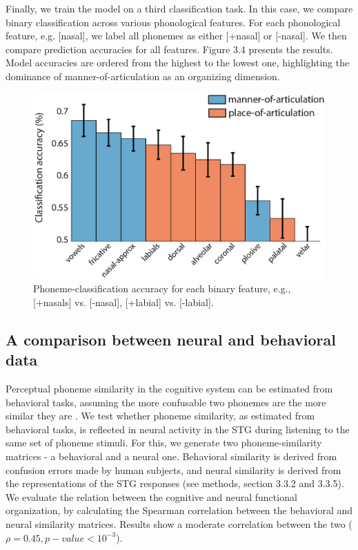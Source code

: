 Finally, we train the model on a third classification task. In this case, we compare binary classification across various phonological features. For each phonological feature, e.g. [nasal], we label all phonemes as either [+nasal] or [-nasal]. We then compare prediction accuracies for all features. Figure 3.4 presents the results. Model accuracies are ordered from the highest to the lowest one, highlighting the dominance of manner-of-articulation as an organizing dimension.

\begin{figure}[H]
\vspace{.3in}
\includegraphics[width=\linewidth]{Figures/Ch3/Figure5_new.eps}
\caption{Phoneme-classification accuracy for each binary feature, e.g., [+nasals] vs. [-nasal], [+labial] vs. [-labial].}
\end{figure}

\subsection{A comparison between neural and behavioral data}
Perceptual phoneme similarity in the cognitive system can be estimated from behavioral tasks, assuming the more confusable two phonemes are the more similar they are \citep{Tversky1977, Shepard1987}. We test whether phoneme similarity, as estimated from behavioral tasks, is reflected in neural activity in the STG during listening to the same set of phoneme stimuli. For this, we generate two phoneme-similarity matrices - a behavioral and a neural one. Behavioral similarity is derived from confusion errors made by human subjects, and neural similarity is derived from the representations of the STG responses (see methods, section 3.3.2 and 3.3.5). We evaluate the relation between the cognitive and neural functional organization, by calculating the Spearman correlation between the behavioral and neural similarity matrices. Results show a moderate correlation between the two ($\rho = 0.45, p-value < 10^{-3}$).

